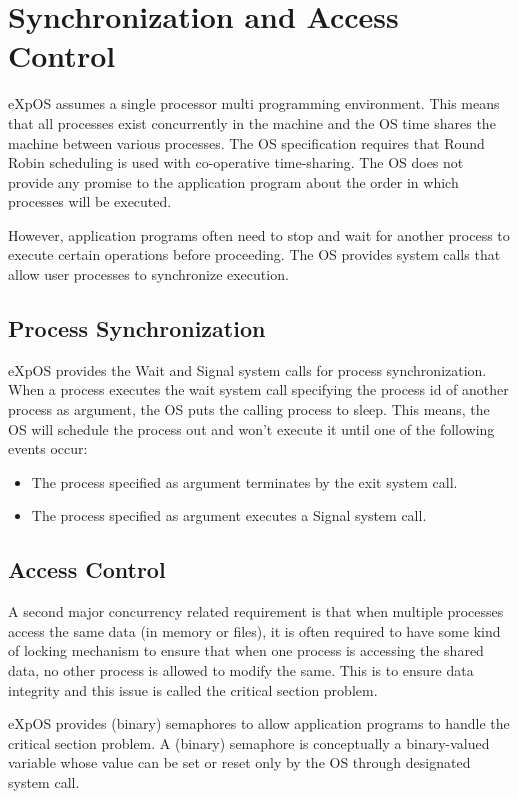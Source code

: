 \chapter{Synchronization and Access Control}
\label{chap5}

eXpOS assumes a single processor multi programming environment. This means that all processes exist concurrently in the machine and the OS time shares the machine between various processes. The OS specification requires that Round Robin scheduling is used with co-operative time-sharing. The OS does not provide any promise to the application program about the order in which processes will be executed.

However, application programs often need to stop and wait for another process to execute certain operations before proceeding. The OS provides system calls that allow user processes to synchronize execution.

\section{Process Synchronization}

eXpOS provides the Wait and Signal system calls for process synchronization. When a process executes the wait system call specifying the process id of another process as argument, the OS puts the calling process to sleep. This means, the OS will schedule the process out and won't execute it until one of the following events occur:
\begin{itemize}
\item The process specified as argument terminates by the exit system call.
\item The process specified as argument executes a Signal system call.

\end {itemize}

\section{Access Control}
A second major concurrency related requirement is that when multiple processes access the same data (in memory or files), it is often required to have some kind of locking mechanism to ensure that when one process is accessing the shared data, no other process is allowed to modify the same. This is to ensure data integrity and this issue is called the critical section problem.

eXpOS provides (binary) semaphores to allow application programs to handle the critical section problem. A (binary) semaphore is conceptually a binary-valued variable whose value can be set or reset only by the OS through designated system call. 

